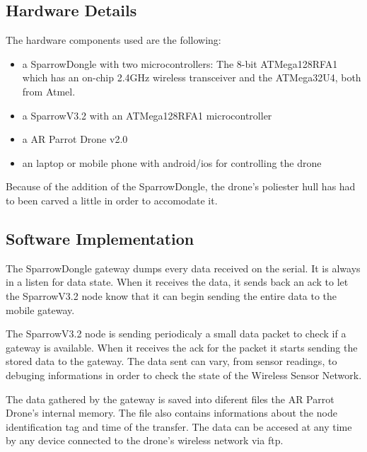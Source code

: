 \label{chap:impl}

 \subsection{Hardware Details}

The hardware components used are the following:
\begin{itemize}

\item a SparrowDongle with two microcontrollers: The 8-bit ATMega128RFA1 which has an on-chip 2.4GHz wireless transceiver and the ATMega32U4, both from Atmel.

\item a SparrowV3.2  with an ATMega128RFA1 microcontroller 

\item a AR Parrot Drone v2.0

\item an laptop or mobile phone with android/ios for controlling the drone

\end{itemize}

Because of the addition of the SparrowDongle, the drone's poliester hull has had to been carved a little in order to accomodate it.
 

\subsection{Software Implementation}

The SparrowDongle gateway dumps every data received on the serial. It is always in a listen for data state. When it receives the data, it sends back an ack to let the SparrowV3.2 node know that it can begin sending the entire data to the mobile gateway. 

The SparrowV3.2 node is sending periodicaly a small data packet to check if a gateway is available. When it receives the ack for the packet it starts sending the stored data to the gateway. The data sent can vary, from sensor readings, to debuging informations in order to check the state of the Wireless Sensor Network.

The data gathered by the gateway is saved into diferent files the AR Parrot Drone's internal memory. The file also contains informations about the node identification tag and time of the transfer. The data can be accesed at any time by any device connected to the drone's wireless network via ftp.
